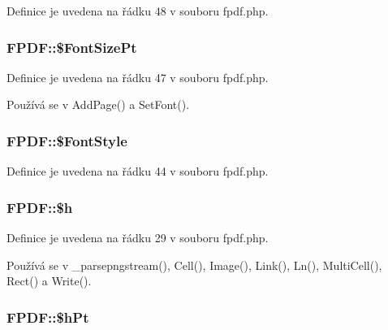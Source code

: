 Definice je uvedena na řádku 48 v souboru fpdf.\-php.

\hypertarget{class_f_p_d_f_ad7b6864ec7f83300c00ae1a1c9123c0b}{
\subsubsection[{\$\-Font\-Size\-Pt}]{\setlength{\rightskip}{0pt plus 5cm}F\-P\-D\-F\-::\$\-Font\-Size\-Pt}}\label{class_f_p_d_f_ad7b6864ec7f83300c00ae1a1c9123c0b}


Definice je uvedena na řádku 47 v souboru fpdf.\-php.



Používá se v Add\-Page() a Set\-Font().

\hypertarget{class_f_p_d_f_a20531c00b4f38558ee888a16e16ef768}{
\subsubsection[{\$\-Font\-Style}]{\setlength{\rightskip}{0pt plus 5cm}F\-P\-D\-F\-::\$\-Font\-Style}}\label{class_f_p_d_f_a20531c00b4f38558ee888a16e16ef768}


Definice je uvedena na řádku 44 v souboru fpdf.\-php.

\hypertarget{class_f_p_d_f_a6bb420fc8cb8cf3d2218bb9148394999}{
\subsubsection[{\$h}]{\setlength{\rightskip}{0pt plus 5cm}F\-P\-D\-F\-::\$h}}\label{class_f_p_d_f_a6bb420fc8cb8cf3d2218bb9148394999}


Definice je uvedena na řádku 29 v souboru fpdf.\-php.



Používá se v \-\_\-parsepngstream(), Cell(), Image(), Link(), Ln(), Multi\-Cell(), Rect() a Write().

\hypertarget{class_f_p_d_f_ac49ef47de69b357309f22c19231863e8}{
\subsubsection[{\$h\-Pt}]{\setlength{\rightskip}{0pt plus 5cm}F\-P\-D\-F\-::\$h\-Pt}}\label{class_f_p_d_f_ac49ef47de69b357309f22c19231863e8}


